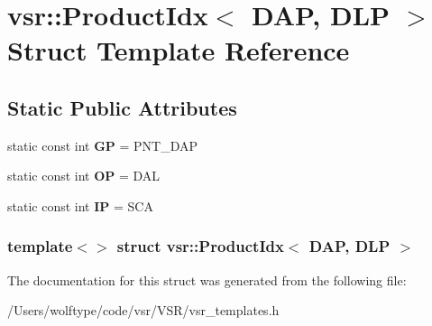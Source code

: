 \hypertarget{structvsr_1_1_product_idx_3_01_d_a_p_00_01_d_l_p_01_4}{\section{vsr\-:\-:Product\-Idx$<$ D\-A\-P, D\-L\-P $>$ Struct Template Reference}
\label{structvsr_1_1_product_idx_3_01_d_a_p_00_01_d_l_p_01_4}
}
\subsection*{Static Public Attributes}
\begin{DoxyCompactItemize}
\item 
\hypertarget{structvsr_1_1_product_idx_3_01_d_a_p_00_01_d_l_p_01_4_a08612ec35186f1c1af1591efb682fba7}{static const int {\bfseries G\-P} = P\-N\-T\-\_\-\-D\-A\-P}\label{structvsr_1_1_product_idx_3_01_d_a_p_00_01_d_l_p_01_4_a08612ec35186f1c1af1591efb682fba7}

\item 
\hypertarget{structvsr_1_1_product_idx_3_01_d_a_p_00_01_d_l_p_01_4_a76add4b333328fc836c669fdf1aab564}{static const int {\bfseries O\-P} = D\-A\-L}\label{structvsr_1_1_product_idx_3_01_d_a_p_00_01_d_l_p_01_4_a76add4b333328fc836c669fdf1aab564}

\item 
\hypertarget{structvsr_1_1_product_idx_3_01_d_a_p_00_01_d_l_p_01_4_ae037eb246631a96f129277e7f3afd28c}{static const int {\bfseries I\-P} = S\-C\-A}\label{structvsr_1_1_product_idx_3_01_d_a_p_00_01_d_l_p_01_4_ae037eb246631a96f129277e7f3afd28c}

\end{DoxyCompactItemize}
\subsubsection*{template$<$$>$ struct vsr\-::\-Product\-Idx$<$ D\-A\-P, D\-L\-P $>$}



The documentation for this struct was generated from the following file\-:\begin{DoxyCompactItemize}
\item 
/\-Users/wolftype/code/vsr/\-V\-S\-R/vsr\-\_\-templates.\-h\end{DoxyCompactItemize}
